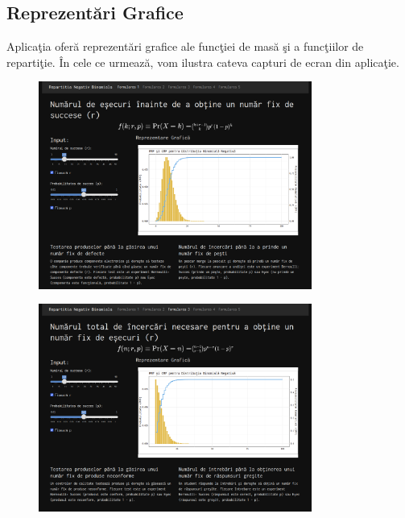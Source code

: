 \documentclass[a4paper,11pt]{article}
\begin{document}
\subsection*{Reprezent\u{a}ri Grafice}

Aplica\c{t}ia ofer\u{a} reprezent\u{a}ri grafice ale func\c{t}iei de mas\u{a} \c{s}i a func\c{t}iilor de reparti\c{t}ie. În cele ce urmeaz\u{a}, vom ilustra cateva capturi de ecran din aplica\c{t}ie.

\begin{figure}[h!]
  \centering
  \includegraphics[width=0.8\textwidth]{./img/6.png}
  \label{fig:imaginea_ta_6}
\end{figure}

\begin{figure}[h!]
  \centering
  \includegraphics[width=0.8\textwidth]{./img/7.png}
  \label{fig:imaginea_ta_7}
\end{figure}
\end{document}
